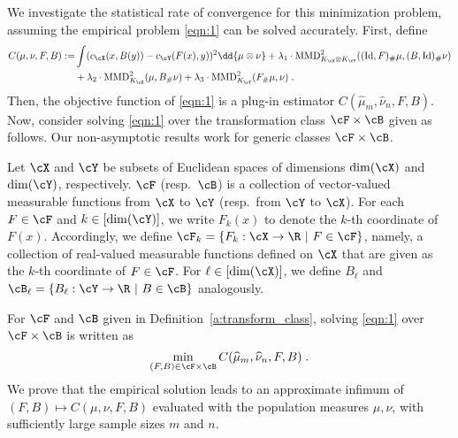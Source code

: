 \documentclass[11pt]{article}
\begin{document}
We investigate the statistical rate of convergence for this minimization problem, assuming the empirical problem \eqref{eqn:1} can be solved accurately. First, define
\begin{equation}
	\label{eqn:cost-def}
	\begin{split}
		C(\mu, \nu, F, B) := & \int (c_{\cX}(x, B(y)) - c_{\cY}(F(x), y))^2 \dd{\mu \otimes \nu} + \lambda_1 \cdot \mathrm{MMD}_{K_{\cX} \otimes K_{\cY}}^2((\mathrm{Id}, F)_{\#} \mu, (B, \mathrm{Id})_{\#} \nu)\\
		& + \lambda_2 \cdot \mathrm{MMD}_{K_{\cX}}^2(\mu, B_{\#} \nu) + \lambda_3 \cdot \mathrm{MMD}_{K_{\cY}}^2(F_{\#} \mu, \nu) \;.
	\end{split}
\end{equation}
Then, the objective function of \eqref{eqn:1} is a plug-in estimator $C(\widehat{\mu}_m, \widehat{\nu}_n, F, B)$. Now, consider solving \eqref{eqn:1} over the transformation class $\cF \times \cB$ given as follows. Our non-asymptotic results work for generic classes $\cF \times \cB$.

\begin{definition}
	\label{a:transform_class}
	Let $\cX$ and $\cY$ be subsets of Euclidean spaces of dimensions $\mathrm{dim}(\cX)$ and $\mathrm{dim}(\cY)$, respectively. $\cF$ (resp.\ $\cB$) is a collection of vector-valued measurable functions from $\cX$ to $\cY$ (resp.\ from $\cY$ to $\cX$). For each $F \in \cF$ and $k \in [\mathrm{dim}(\cY)]$, we write $F_k(x)$ to denote the $k$-th coordinate of $F(x)$. Accordingly, we define $\cF_k =\{F_k: \cX \rightarrow \R ~|~ F \in \cF\}$, namely, a collection of real-valued measurable functions defined on $\cX$ that are given as the $k$-th coordinate of $F \in \cF$. For $\ell \in [\mathrm{dim}(\cX)]$, we define $B_\ell$ and $\cB_{\ell} = \{B_\ell: \cY \rightarrow \R ~|~ B \in \cB\}$ analogously.
\end{definition}

For $\cF$ and $\cB$ given in Definition~\ref{a:transform_class}, solving \eqref{eqn:1} over $\cF \times \cB$ is written as
\begin{equation*}
	\min_{(F, B) \in \cF \times \cB} C(\widehat{\mu}_m, \widehat{\nu}_n, F, B)\;.
\end{equation*}
We prove that the empirical solution leads to an approximate infimum of $(F, B) \mapsto C(\mu, \nu, F, B)$ evaluated with the population measures $\mu, \nu$, with sufficiently large sample sizes $m$ and $n$.
\end{document}
